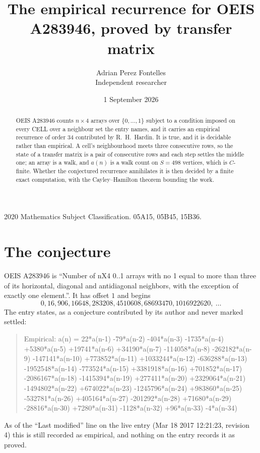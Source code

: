 \documentclass[11pt,a4paper]{article}
\title{The empirical recurrence for OEIS A283946, proved by transfer matrix}
\author{Adrian Perez Fontelles\\ \small Independent researcher}
\date{1 September 2026}
\theoremstyle{plain}
\theoremstyle{definition}
\begin{document}
\maketitle

\begin{abstract}
OEIS A283946 counts $n\times4$ arrays over $\{0,\dots,1\}$ subject to a condition imposed on
every CELL over a neighbour set the entry names, and it carries an empirical recurrence of
order $34$ contributed by R.~H.~Hardin. It is true, and it is decidable rather than
empirical. A cell's neighbourhood meets three consecutive rows, so the state of a transfer
matrix is a pair of consecutive rows and each step settles the middle one; an array is a
walk, and $a(n)$ is a walk count on $S=498$ vertices, which is $C$-finite. Whether the
conjectured recurrence annihilates it is then decided by a finite exact computation, with the
Cayley--Hamilton theorem bounding the work.
\end{abstract}

\noindent\small 2020 Mathematics Subject Classification. 05A15, 05B45, 15B36.\normalsize

\section{The conjecture}

OEIS A283946 is ``Number of nX4 0..1 arrays with no 1 equal to more than three of its horizontal, diagonal and antidiagonal neighbors, with the exception of exactly one element.''. It has offset $1$ and begins
\[
0, 16, 906, 16648, 283208, 4510608, 68693470, 1016922620,\ \dots
\]
The entry states, as a conjecture contributed by its author and never marked settled:
\begin{quote}
Empirical: a(n) = 22*a(n-1) -79*a(n-2) -404*a(n-3) -1735*a(n-4) +5380*a(n-5) +19741*a(n-6) +34190*a(n-7) -114058*a(n-8) -262182*a(n-9) -147141*a(n-10) +773852*a(n-11) +1033244*a(n-12) -636288*a(n-13) -1952548*a(n-14) -773524*a(n-15) +3381918*a(n-16) +701852*a(n-17) -2086167*a(n-18) -1415394*a(n-19) +277411*a(n-20) +2329064*a(n-21) -1494802*a(n-22) +674022*a(n-23) -1245796*a(n-24) +983860*a(n-25) -532781*a(n-26) +405164*a(n-27) -201292*a(n-28) +71680*a(n-29) -28816*a(n-30) +7280*a(n-31) -1128*a(n-32) +96*a(n-33) -4*a(n-34)
\end{quote}
As of the ``Last modified'' line on the live entry (Mar 18 2017 12:21:23, revision 4) this is still
recorded as empirical, and nothing on the entry records it as proved.
\end{document}
